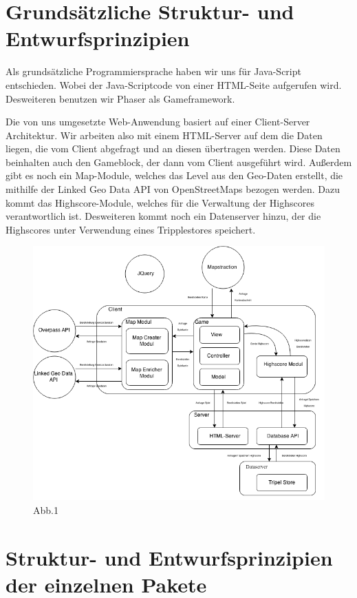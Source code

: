 \documentclass[11pt,a4paper]{article}
\begin{document}
\section{Grundsätzliche Struktur- und Entwurfsprinzipien}
Als grundsätzliche Programmiersprache haben wir uns für Java-Script entschieden. Wobei der Java-Scriptcode von einer HTML-Seite aufgerufen wird. Desweiteren benutzen wir Phaser als Gameframework.

Die von uns umgesetzte Web-Anwendung basiert auf einer Client-Server Architektur. Wir arbeiten also mit einem HTML-Server auf dem die Daten liegen, die vom Client abgefragt und an diesen übertragen werden. Diese Daten beinhalten auch den Gameblock, der dann vom Client ausgeführt wird. Außerdem gibt es noch ein Map-Module, welches das Level aus den Geo-Daten erstellt, die mithilfe der Linked Geo Data API von OpenStreetMaps bezogen werden. Dazu kommt das Highscore-Module, welches für die Verwaltung der Highscores verantwortlich ist. Desweiteren kommt noch ein Datenserver hinzu, der die Highscores unter Verwendung eines Tripplestores speichert.\\
\begin{figure}[htb]
  \centering
  \includegraphics[scale=0.4]{arch_new.png}
\caption{Abb.1}
  \label{PNFs}
\end{figure} 



\section{Struktur- und Entwurfsprinzipien der einzelnen Pakete}
\end{document}
